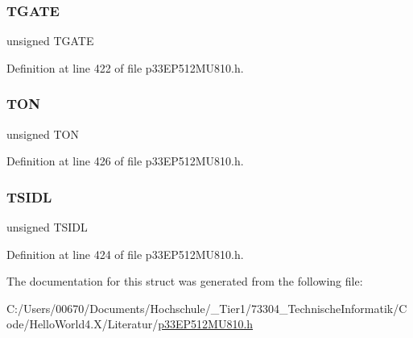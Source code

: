 \subsubsection{\texorpdfstring{T\+G\+A\+TE}{TGATE}}
{\footnotesize\ttfamily unsigned T\+G\+A\+TE}



Definition at line 422 of file p33\+E\+P512\+M\+U810.\+h.

\mbox{\label{structtag_t7_c_o_n_b_i_t_s_a8c2a094047d1019ce1c5b25ea8cff9b3}} 
\subsubsection{\texorpdfstring{T\+ON}{TON}}
{\footnotesize\ttfamily unsigned T\+ON}



Definition at line 426 of file p33\+E\+P512\+M\+U810.\+h.

\mbox{\label{structtag_t7_c_o_n_b_i_t_s_a4971b881615ef42703b5b78179fcda3d}} 
\subsubsection{\texorpdfstring{T\+S\+I\+DL}{TSIDL}}
{\footnotesize\ttfamily unsigned T\+S\+I\+DL}



Definition at line 424 of file p33\+E\+P512\+M\+U810.\+h.



The documentation for this struct was generated from the following file\+:\begin{DoxyCompactItemize}
\item 
C\+:/\+Users/00670/\+Documents/\+Hochschule/\+\_\+\+Tier1/73304\+\_\+\+Technische\+Informatik/\+Code/\+Hello\+World4.\+X/\+Literatur/\hyperlink{p33_e_p512_m_u810_8h}{p33\+E\+P512\+M\+U810.\+h}\end{DoxyCompactItemize}
